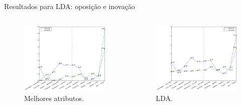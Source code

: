 \documentclass{beamer}
\begin{document}
\begin{frame}{Resultados para LDA: oposição e inovação}

  \begin{columns}

   \begin{column}{.49\textwidth}
\begin{figure}[h!]
\begin{center}
\includegraphics[width=\columnwidth]{figs/caso1_oposEinov}
        \caption{Melhores atributos.}
\end{center}
\end{figure}
\end{column}


    \begin{column}{.49\textwidth}
\begin{figure}[h!]
\begin{center}
\includegraphics[width=\columnwidth]{figs/caso3_oposEinov}
        \caption{LDA.}
\end{center}
\end{figure}
\end{column}
\end{columns}

\end{frame}
\end{document}
